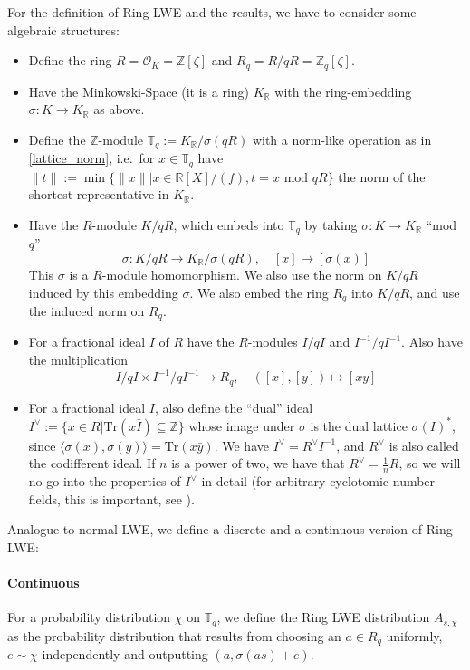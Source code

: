 \documentclass{report}
\newcommand{\T}{\mathbb{T}}
\newcommand{\Z}{\mathbb{Z}}
\newcommand{\R}{\mathbb{R}}
\renewcommand{\mod}{\text{ mod }}
\begin{document}
For the definition of Ring LWE and the results, we have to consider some algebraic structures:
\begin{itemize}
\item Define the ring $R = \mathcal{O}_K = \Z[\zeta]$ and $R_q = R / qR = \Z_q[\zeta]$.
\item Have the Minkowski-Space (it is a ring) $K_\R$ with the ring-embedding $\sigma: K \to K_\R$ as above.
\item Define the $\Z$-module $\T_q := K_\R / \sigma(qR)$ with a norm-like operation as in \ref{lattice_norm}, i.e.\ for $x \in \T_q$ have $\| t \| := \min \{ \| x \| | x \in \R[X] / (f), t = x \mod qR \}$ the norm of the shortest representative in $K_\R$.
\item Have the $R$-module $K / qR$, which embeds into $\T_q$ by taking $\sigma: K \to K_\R$ ``mod $q$''
\begin{equation}
\sigma: K / qR \to K_\R / \sigma(qR), \quad [x] \mapsto [\sigma(x)] \nonumber
\end{equation}
This $\sigma$ is a $R$-module homomorphism. We also use the norm on $K / qR$ induced by this embedding $\sigma$. We also embed the ring $R_q$ into $K / qR$, and use the induced norm on $R_q$.
\item For a fractional ideal $I$ of $R$ have the $R$-modules $I / qI$ and $I^{-1} / qI^{-1}$. Also have the multiplication 
\begin{equation}
I / qI \times I^{-1} / qI^{-1} \to R_q, \quad ([x], [y]) \mapsto [xy] \nonumber
\end{equation}
\item For a fractional ideal $I$, also define the ``dual'' ideal $I^\vee := \{ x \in R | \mathrm{Tr}(x\bar{I}) \subseteq \Z \}$ whose image under $\sigma$ is the dual lattice $\sigma(I)^*$, since $\langle \sigma(x), \sigma(y) \rangle = \mathrm{Tr}(x\bar{y})$. We have $I^\vee = R^\vee I^{-1}$, and $R^\vee$ is also called the codifferent ideal. If $n$ is a power of two, we have that $R^\vee = \frac 1 n R$, so we will no go into the properties of $I^\vee$ in detail (for arbitrary cyclotomic number fields, this is important, see \cite{LyuPeiReg}).
\end{itemize}

Analogue to normal LWE, we define a discrete and a continuous version of Ring LWE:
\paragraph{Continuous} For a probability distribution $\chi$ on $\T_q$, we define the Ring LWE distribution $A_{s, \chi}$ as the probability distribution that results from choosing an $a \in R_q$ uniformly, $e \sim \chi$ independently and outputting $(a, \sigma(as) + e)$.
\end{document}
